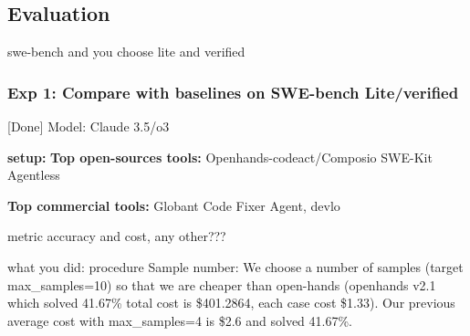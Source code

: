 




\subsection{Evaluation}

swe-bench and you choose lite and verified 

\subsubsection{Exp 1: Compare with baselines on SWE-bench Lite/verified} [Done]
Model: Claude 3.5/o3

\textbf{setup:} 
\textbf{Top open-sources tools:}
Openhands-codeact/Composio SWE-Kit 
Agentless

\textbf{Top commercial tools:} Globant Code Fixer Agent, devlo

metric accuracy and cost, any other???

what you did: procedure
Sample number: We choose a number of samples (target max\_samples=10) so that we are cheaper than open-hands (openhands v2.1 which solved 41.67\% total cost is \$401.2864, each case cost \$1.33). Our previous average cost with max\_samples=4 is \$2.6 and solved 41.67\%.



